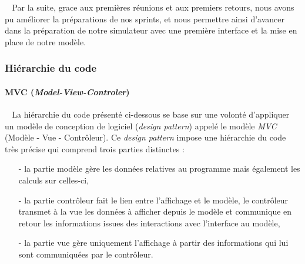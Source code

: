 \documentclass[12pt]{article}
\def\tab{$\>\>\>\>$}
\begin{document}
\tab Par la suite, grace aux premières réunions et aux premiers retours, nous avons pu améliorer la préparations de nos sprints, et nous permettre ainsi d'avancer dans la préparation de notre simulateur avec une première interface et la mise en place de notre modèle.


\subsubsection{Hiérarchie du code}

\paragraph{MVC (\textit{Model-View-Controler})\\}
\tab La hiérarchie du code présenté ci-dessous se base sur une volonté d'appliquer un modèle de conception de logiciel (\textit{design pattern}) appelé le modèle \textit{MVC} (Modèle - Vue - Contrôleur). Ce \textit{design pattern} impose une hiérarchie du code très précise qui comprend trois parties distinctes : \begin{itemize}
\item[-] la partie modèle gère les données relatives au programme mais également les calculs sur celles-ci,
\item[-] la partie contrôleur fait le lien entre l'affichage et le modèle, le contrôleur transmet à la vue les données à afficher depuis le modèle et communique en retour les informations issues des interactions avec l'interface au modèle,
\item[-] la partie vue gère uniquement l'affichage à partir des informations qui lui sont communiquées par le contrôleur.
\end{itemize}

\newpage
\paragraph{\\}
\end{document}
